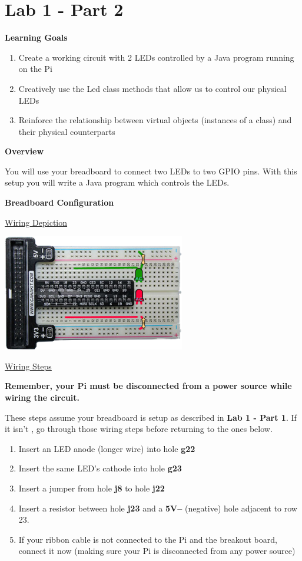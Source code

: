 \section{Lab 1 - Part 2}

\textbf{Learning Goals}

\begin{enumerate}
	\item Create a working circuit with 2 LEDs controlled by a Java program running on the Pi
	\item Creatively use the Led class methods that allow us to control our physical LEDs
	\item Reinforce the relationship between virtual objects (instances of a class) and their physical counterparts
\end{enumerate}

\textbf{Overview}

You will use your breadboard to connect two LEDs to two GPIO pins. With this setup you will write a Java program which controls the LEDs. 

\textbf{Breadboard Configuration}

\underline{Wiring Depiction}

\beforefig
\centerline{\includegraphics[height=2in]{pi_images/lab01images/PiLab01-2Light.png}}
\afterfig

\underline{Wiring Steps}

\textbf{Remember, your Pi must be disconnected from a power source while wiring the circuit.}

These steps assume your breadboard is setup as described in \textbf{Lab 1 - Part 1}. If it isn't , go through those wiring steps before returning to the ones below.

\begin{enumerate}
	\item Insert an LED anode (longer wire) into hole \textbf{g22}
	\item Insert the same LED's cathode into hole \textbf{g23}
	
	\item Insert a jumper from hole \textbf{j8} to hole \textbf{j22}

	\item Insert a resistor between hole \textbf{j23} and a \textbf{5V--} (negative) hole adjacent to row 23.
	
	\item If your ribbon cable is not connected to the Pi and the breakout board, connect it now (making sure your Pi is disconnected from any power source)
\end{enumerate}

